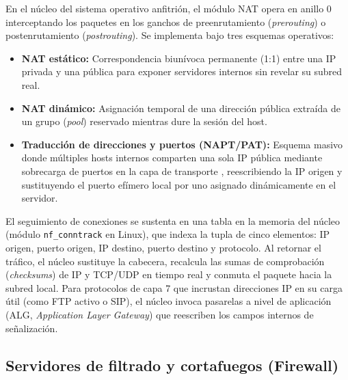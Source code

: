 \documentclass[12pt]{article}
\begin{document}
En el núcleo del sistema operativo anfitrión, el módulo NAT opera en anillo 0 interceptando los paquetes en los ganchos de preenrutamiento (\textit{prerouting}) o postenrutamiento (\textit{postrouting}). Se implementa bajo tres esquemas operativos:
\begin{itemize}[noitemsep, topsep=1pt, parsep=0pt]
    \item \textbf{NAT estático:} Correspondencia biunívoca permanente (1:1) entre una IP privada y una pública para exponer servidores internos sin revelar su subred real.
    \item \textbf{NAT dinámico:} Asignación temporal de una dirección pública extraída de un grupo (\textit{pool}) reservado mientras dure la sesión del host.
    \item \textbf{Traducción de direcciones y puertos (NAPT/PAT):} Esquema masivo donde múltiples hosts internos comparten una sola IP pública mediante sobrecarga de puertos en la capa de transporte \parencite[\S 4, pp.\ 6--8]{rfc3022}, reescribiendo la IP origen y sustituyendo el puerto efímero local por uno asignado dinámicamente en el servidor.
\end{itemize}

El seguimiento de conexiones se sustenta en una tabla en la memoria del núcleo (módulo \texttt{nf\_conntrack} en Linux), que indexa la tupla de cinco elementos: IP origen, puerto origen, IP destino, puerto destino y protocolo. Al retornar el tráfico, el núcleo sustituye la cabecera, recalcula las sumas de comprobación (\textit{checksums}) de IP y TCP/UDP en tiempo real y conmuta el paquete hacia la subred local. Para protocolos de capa 7 que incrustan direcciones IP en su carga útil (como FTP activo o SIP), el núcleo invoca pasarelas a nivel de aplicación (ALG, \textit{Application Layer Gateway}) que reescriben los campos internos de señalización.

\subsection{Servidores de filtrado y cortafuegos (Firewall)}
\label{sec:servidoresFirewall}
\end{document}

